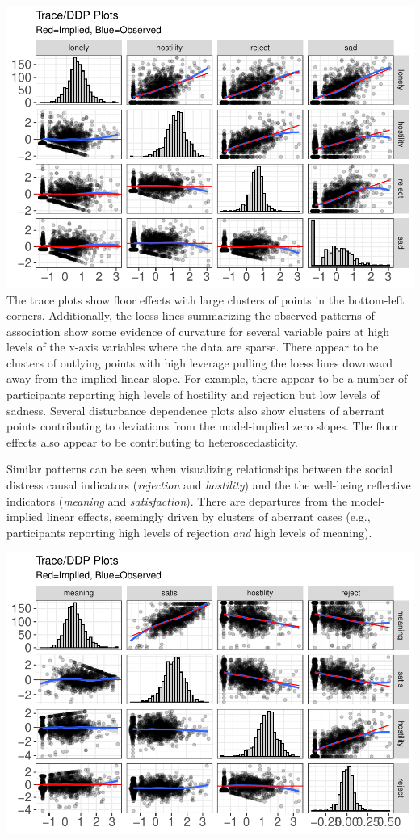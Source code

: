 \documentclass[
  english,
  doc]{apa6}
\begin{document}
\includegraphics{flexplavaan_draft_files/figure-latex/unnamed-chunk-4-1.pdf}
The trace plots show floor effects with large clusters of points in the bottom-left corners. Additionally, the loess lines summarizing the observed patterns of association show some evidence of curvature for several variable pairs at high levels of the x-axis variables where the data are sparse. There appear to be clusters of outlying points with high leverage pulling the loess lines downward away from the implied linear slope. For example, there appear to be a number of participants reporting high levels of hostility and rejection but low levels of sadness. Several disturbance dependence plots also show clusters of aberrant points contributing to deviations from the model-implied zero slopes. The floor effects also appear to be contributing to heteroscedasticity.

Similar patterns can be seen when visualizing relationships between the social distress causal indicators (\emph{rejection} and \emph{hostility}) and the the well-being reflective indicators (\emph{meaning} and \emph{satisfaction}). There are departures from the model-implied linear effects, seemingly driven by clusters of aberrant cases (e.g., participants reporting high levels of rejection \emph{and} high levels of meaning).

\includegraphics{flexplavaan_draft_files/figure-latex/unnamed-chunk-5-1.pdf}
\end{document}
